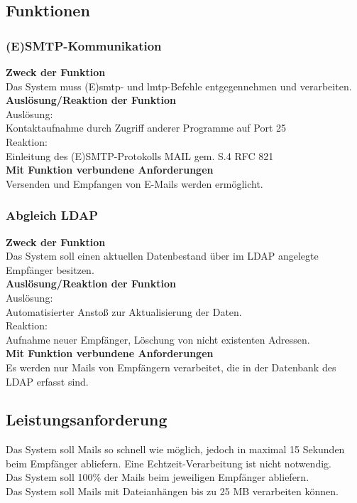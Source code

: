 \subsection{Funktionen}
\subsubsection*{(E)SMTP-Kommunikation}
\textbf{Zweck der Funktion} \\
Das System muss (E)\ac{smtp}- und \ac{lmtp}-Befehle entgegennehmen und verarbeiten. \\
\textbf{Auslösung/Reaktion der Funktion} \\
Auslösung: \\
Kontaktaufnahme durch Zugriff anderer Programme auf Port 25\\
Reaktion:\\
Einleitung des (E)SMTP-Protokolls MAIL gem. S.4 RFC 821 \\
\textbf{Mit Funktion verbundene Anforderungen} \\
Versenden und Empfangen von E-Mails werden ermöglicht.\\
\subsubsection*{Abgleich LDAP}
\textbf{Zweck der Funktion} \\
Das System soll einen aktuellen Datenbestand über im LDAP angelegte Empfänger besitzen.\\
\textbf{Auslösung/Reaktion der Funktion} \\
Auslösung:\\
Automatisierter Anstoß zur Aktualisierung der Daten.\\
Reaktion:\\
Aufnahme neuer Empfänger, Löschung von nicht existenten Adressen.\\
\textbf{Mit Funktion verbundene Anforderungen}\\
Es werden nur Mails von Empfängern verarbeitet, die in der Datenbank des LDAP erfasst sind.\\
\subsection{Leistungsanforderung}
Das System soll Mails so schnell wie möglich, jedoch in maximal 15 Sekunden beim Empfänger abliefern. Eine Echtzeit-Verarbeitung ist nicht notwendig.\\
Das System soll 100\% der Mails beim jeweiligen Empfänger abliefern.\\
Das System soll Mails mit Dateianhängen bis zu 25 MB verarbeiten können.\\

